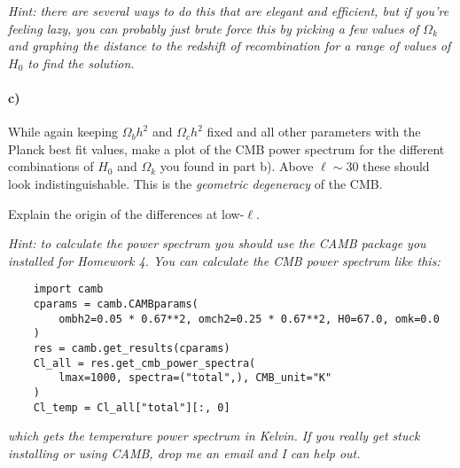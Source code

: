\documentclass[12pt]{article}
\begin{document}
\emph{Hint: there are several ways to do this that are elegant and efficient, but if you're feeling lazy, you can probably just brute force this by picking a few values of $\Omega_k$ and graphing the distance to the redshift of recombination for a range of values of $H_0$ to find the solution.}

\paragraph{c)} While again keeping $\Omega_b h^2$ and $\Omega_c h^2$ fixed and all other parameters with the Planck best fit values, make a plot of the CMB power spectrum for the different combinations of $H_0$ and $\Omega_k$ you found in part b). Above $\ell \sim 30$ these should look indistinguishable. This is the \emph{geometric degeneracy} of the CMB.

Explain the origin of the differences at low-$\ell$.

\noindent \emph{Hint: to calculate the power spectrum you should use the CAMB package you installed for Homework 4. You can calculate the CMB power spectrum like this:}
\begin{verbatim}
    import camb
    cparams = camb.CAMBparams(
        ombh2=0.05 * 0.67**2, omch2=0.25 * 0.67**2, H0=67.0, omk=0.0
    )
    res = camb.get_results(cparams)
    Cl_all = res.get_cmb_power_spectra(
        lmax=1000, spectra=("total",), CMB_unit="K"
    )
    Cl_temp = Cl_all["total"][:, 0]
\end{verbatim}
\emph{which gets the temperature power spectrum in Kelvin. If you really get stuck installing or using CAMB, drop me an email and I can help out.}
\end{document}
